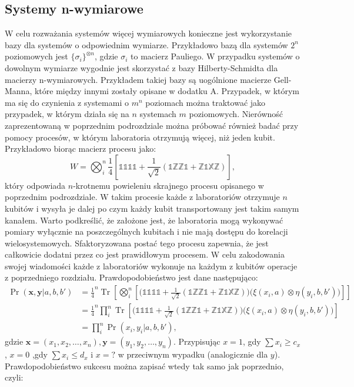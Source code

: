 \documentclass[10pt]{article} %
\DeclareMathOperator{\Trs}{Tr}
\newcommand{\X}{\mathbb{X}}
\newcommand{\Z}{\mathbb{Z}}
\newcommand{\I}{\mathbb{1}}
\begin{document}
\subsection{Systemy n-wymiarowe}
W celu rozważania systemów więcej wymiarowych konieczne jest wykorzystanie bazy dla systemów o odpowiednim wymiarze. Przykładowo bazą dla systemów
$2^n$ poziomowych jest $\{ \sigma_i \}^{\otimes n}$, gdzie $\sigma_i$ to macierz Pauliego. W przypadku systemów o dowolnym wymiarze wygodnie jest
skorzystać z bazy Hilberty-Schmidta dla macierzy n-wymiarowych. Przykładem takiej bazy są uogólnione macierze Gell-Manna, które między innymi zostały opisane
w dodatku A. Przypadek, w którym ma się do czynienia z systemami o $m^n$ poziomach można traktować jako przypadek, w którym działa się na $n$ systemach
$m$ poziomowych. Nierówność zaprezentowaną w poprzednim podrozdziale można próbować również badać przy pomocy procesów, w którym laboratoria otrzymują więcej, niż jeden kubit. Przykładowo biorąc macierz procesu jako:
\begin{equation}
W =  \bigotimes_i^{n}\frac{1}{4}\left[ \I\I\I\I + \frac{1}{\sqrt{2}}\left( \I\Z\Z\I + \Z\I\X\Z \right) \right],
\end{equation} który odpowiada $n$-krotnemu powieleniu skrajnego procesu opisanego w poprzednim podrozdziale. W takim procesie każde z laboratoriów otrzymuje
$n$ kubitów i wysyła je dalej po czym każdy kubit transportowany jest takim samym kanałem. Warto podkreślić, że założone jest, że laboratoria mogą wykonywać pomiary wyłącznie na poszczególnych kubitach i nie mają dostępu do korelacji wielosystemowych. Sfaktoryzowana postać tego procesu zapewnia, że jest całkowicie dodatni przez co jest prawidłowym procesem.
W celu zakodowania swojej wiadomości każde z laboratoriów wykonuje na każdym z kubitów operacje z poprzedniego rozdziału. Prawdopodobieństwo jest dane następująco:
\begin{equation}
\begin{split}
\Pr(\mathbf{x}, \mathbf{y} | a, b, b') &= \frac{1}{4}^n\Trs \left[ \bigotimes_i^{n}\left[\Big( \I\I\I\I + \frac{1}{\sqrt{2}} \left( \I\Z\Z\I + \Z\I\X\Z\right)\Big)\Big(\xi(x_i,a) \otimes \eta(y_i, b, b')\Big)\right]\right] \\
&= \frac{1}{4}^n \prod_i^n \Trs\left[ \Big( \I\I\I\I  + \frac{1}{\sqrt{2}} \left( \I\Z\Z\I + \Z\I\X\Z\right)\Big) \Big( \xi(x_i,a) \otimes \eta(y_i, b, b')\Big) \right] \\
&= \prod_i^n \Pr(x_i,y_i |a, b, b'),
\end{split}
\end{equation} gdzie $\mathbf{x} = (x_1, x_2,\dots,x_n), \mathbf{y} = (y_1, y_2, \dots, y_n)$. Przypisując $x=1$, gdy $\sum x_i \geq c_x$, $x=0$  ,gdy $\sum x_i \leq d_x$ i $x=?$ w przeciwnym wypadku (analogicznie dla $y$). Prawdopodobieństwo sukcesu można zapisać wtedy tak samo jak poprzednio, czyli:
\end{document}
